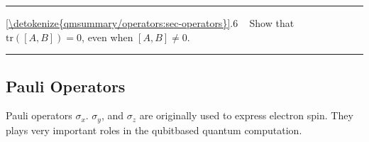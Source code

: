 \documentclass[letterpaper,10pt,english]{jupyterBook}
\begin{document}
\bigskip\hrule\bigskip


\sphinxAtStartPar
{} \hyperref[\detokenize{qmsummary/operators:sec-operators}]{\ref{\detokenize{qmsummary/operators:sec-operators}}}.6     Show that \(\text{tr} \left([A,B]\right) = 0\),  even when \([A,B]\ne 0\).


\bigskip\hrule\bigskip



\subsection{Pauli Operators}
\label{\detokenize{qmsummary/operators:pauli-operators}}\label{\detokenize{qmsummary/operators:sec-pauli-ops}}
\sphinxAtStartPar
Pauli operators \(\sigma_x\). \(\sigma_y\), and \(\sigma_z\) are originally used to express electron spin.  They plays very important roles in the qubit\sphinxhyphen{}based quantum computation.
\end{document}
